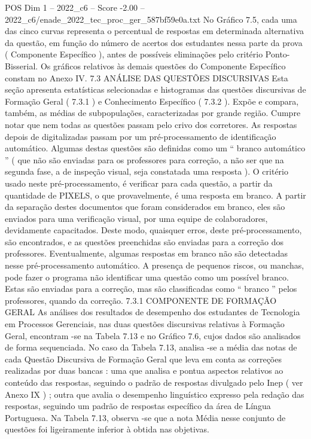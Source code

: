 \begin{textsample}{POS Dim 1 – 2022\_c6 – Score -2.00 – 2022\_c6/enade\_2022\_tec\_proc\_ger\_587bf59e0a.txt}
No Gráfico 7.5, cada uma das cinco curvas representa o percentual de respostas em determinada alternativa da questão, em função do número de acertos dos estudantes nessa parte da prova ( Componente Específico ), antes de possíveis eliminações pelo critério Ponto-Bisserial.
Os gráficos relativos às demais questões do Componente Específico constam no Anexo IV. 7.3 ANÁLISE DAS QUESTÕES DISCURSIVAS Esta seção apresenta estatísticas selecionadas e histogramas das questões discursivas de Formação Geral ( 7.3.1 ) e Conhecimento Específico ( 7.3.2 ).
Expõe e compara, também, as médias de subpopulações, caracterizadas por grande região.
Cumpre notar que nem todas as questões passam pelo crivo dos corretores.
As respostas depois de digitalizadas passam por um pré-processamento de identificação automático.
Algumas destas questões são definidas como um “ branco automático ” ( que não são enviadas para os professores para correção, a não ser que na segunda fase, a de inspeção visual, seja constatada uma resposta ).
O critério usado neste pré-processamento, é verificar para cada questão, a partir da quantidade de PIXELS, o que provavelmente, é uma resposta em branco.
A partir da separação destes documentos que foram considerados em branco, eles são enviados para uma verificação visual, por uma equipe de colaboradores, devidamente capacitados.
Deste modo, quaisquer erros, deste pré-processamento, são encontrados, e as questões preenchidas são enviadas para a correção dos professores.
Eventualmente, algumas respostas em branco não são detectadas nesse pré-processamento automático.
A presença de pequenos riscos, ou manchas, pode fazer o programa não identificar uma questão como um possível branco.
Estas são enviadas para a correção, mas são classificadas como “ branco ” pelos professores, quando da correção. 7.3.1 COMPONENTE DE FORMAÇÃO GERAL As análises dos resultados de desempenho dos estudantes de Tecnologia em Processos Gerenciais, nas duas questões discursivas relativas à Formação Geral, encontram -se na Tabela 7.13 e no Gráfico 7.6, cujos dados são analisados de forma sequenciada.
No caso da Tabela 7.13, analisa -se a média das notas de cada Questão Discursiva de Formação Geral que leva em conta as correções realizadas por duas bancas : uma que analisa e pontua aspectos relativos ao conteúdo das respostas, seguindo o padrão de respostas divulgado pelo Inep ( ver Anexo IX ) ; outra que avalia o desempenho linguístico expresso pela redação das respostas, seguindo um padrão de respostas específico da área de Língua Portuguesa.
Na Tabela 7.13, observa -se que a nota Média nesse conjunto de questões foi ligeiramente inferior à obtida nas objetivas.

\end{textsample}
